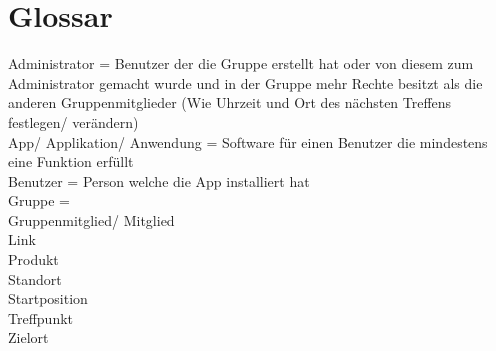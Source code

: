 \section{Glossar}

Administrator = Benutzer der die Gruppe erstellt hat oder von diesem zum Administrator gemacht wurde und in der Gruppe mehr Rechte besitzt als die anderen Gruppenmitglieder (Wie Uhrzeit und Ort des nächsten Treffens festlegen/ verändern)
\\
App/ Applikation/ Anwendung = Software für einen Benutzer die mindestens eine Funktion erfüllt
\\
Benutzer = Person welche die App installiert hat
\\
Gruppe = 
\\
Gruppenmitglied/ Mitglied
\\
Link
\\
Produkt
\\
Standort
\\
Startposition
\\
Treffpunkt
\\
Zielort
\\









